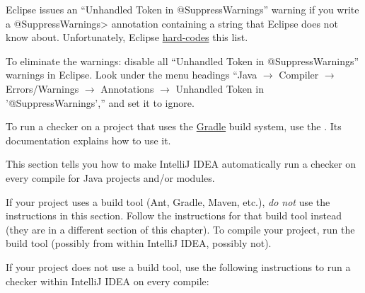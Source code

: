 
Eclipse issues an ``Unhandled Token in @SuppressWarnings'' warning if you
write a \<@SuppressWarnings> annotation containing a string that Eclipse does not
know about.  Unfortunately, Eclipse
\href{https://bugs.eclipse.org/bugs/show_bug.cgi?id=122475}{hard-codes}
this list.

To eliminate the warnings:
disable all ``Unhandled Token in @SuppressWarnings'' warnings in Eclipse.
Look under the menu headings
``Java $\rightarrow$ Compiler $\rightarrow$ Errors/Warnings $\rightarrow$
Annotations $\rightarrow$ Unhandled Token in '@SuppressWarnings',''
and set it to ignore.



To run a checker
on a project that uses the \href{https://gradle.org/}{Gradle} build system,
use the
.  Its documentation explains how to use it.




This section tells you how to make IntelliJ IDEA automatically run a
checker on every compile for Java projects and/or modules.

If your project uses a build tool (Ant, Gradle, Maven, etc.), \emph{do not}
use the instructions in this section.
Follow the instructions for that build tool instead (they are in
a different section of this chapter).  To compile your project, run the
build tool (possibly from within IntelliJ IDEA, possibly not).

If your project does not use a build tool, use the following instructions
to run a checker within IntelliJ IDEA on every compile:

